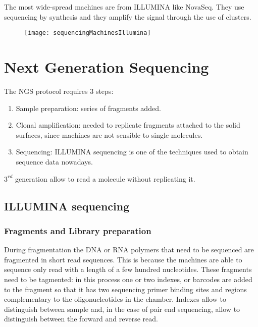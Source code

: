 The most wide-spread machines are from ILLUMINA like NovaSeq.
They use sequencing by synthesis and they amplify the signal through the use of clusters.

\begin{figure}[H]
\centering
\texttt{[image: sequencingMachinesIllumina]}
\caption{}
\label{}
\end{figure}

\section{Next Generation Sequencing}
The NGS protocol requires $3$ steps:

\begin{multicols}{2}
    \begin{enumerate}
          \item Sample preparation: series of fragments added.
          \item Clonal amplification: needed to replicate fragments attached to the solid surfaces, since machines are not sensible to single molecules.
          \item Sequencing: ILLUMINA sequencing is one of the techniques used to obtain sequence data nowadays.
    \end{enumerate}
\end{multicols}

$3^{rd}$ generation allow to read a molecule without replicating it.

    \subsection{ILLUMINA sequencing}

        \subsubsection{Fragments and Library preparation}
        During fragmentation the DNA or RNA polymers that need to be sequenced are fragmented in short read sequences.
        This is because the machines are able to sequence only read with a length of a few hundred nucleotides.
        These fragments need to be tagmented: in this process one or two indexes, or barcodes are added to the fragment so that it has two sequencing primer binding sites and regions complementary to the oligonucleotides in the chamber.
        Indexes allow to distinguish between sample and, in the case of pair end sequencing, allow to distinguish between the forward and reverse read.

